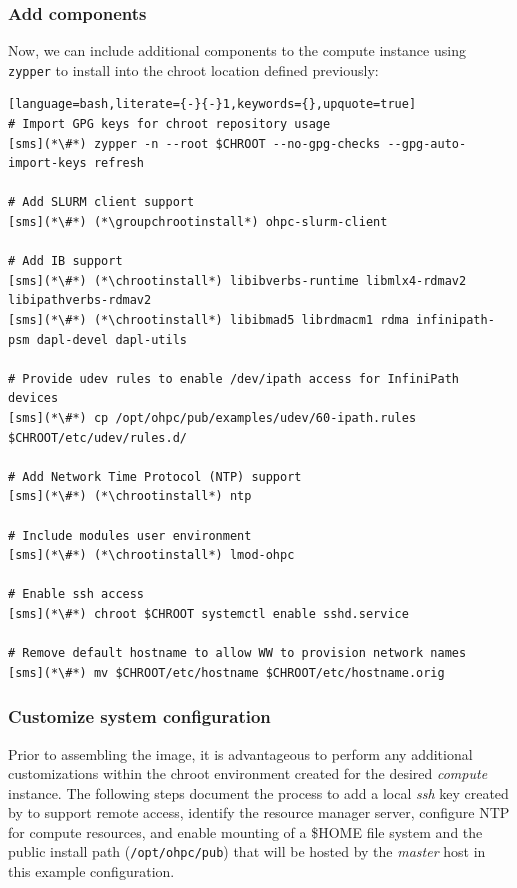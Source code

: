 \documentclass[letterpaper]{article}
\newcommand{\chrootinstall}{zypper -n --root \$CHROOT install}
\newcommand{\groupchrootinstall}{zypper -n --root \$CHROOT install -t pattern}
\begin{document}
\subsubsection{Add \OHPC{} components} \label{sec:add_components}



\noindent Now, we can include additional components to the compute instance using
\texttt{zypper} to install into the chroot location defined previously:

\begin{lstlisting}[language=bash,literate={-}{-}1,keywords={},upquote=true]
# Import GPG keys for chroot repository usage
[sms](*\#*) zypper -n --root $CHROOT --no-gpg-checks --gpg-auto-import-keys refresh

# Add SLURM client support
[sms](*\#*) (*\groupchrootinstall*) ohpc-slurm-client

# Add IB support
[sms](*\#*) (*\chrootinstall*) libibverbs-runtime libmlx4-rdmav2 libipathverbs-rdmav2
[sms](*\#*) (*\chrootinstall*) libibmad5 librdmacm1 rdma infinipath-psm dapl-devel dapl-utils

# Provide udev rules to enable /dev/ipath access for InfiniPath devices
[sms](*\#*) cp /opt/ohpc/pub/examples/udev/60-ipath.rules $CHROOT/etc/udev/rules.d/

# Add Network Time Protocol (NTP) support
[sms](*\#*) (*\chrootinstall*) ntp

# Include modules user environment
[sms](*\#*) (*\chrootinstall*) lmod-ohpc

# Enable ssh access 
[sms](*\#*) chroot $CHROOT systemctl enable sshd.service

# Remove default hostname to allow WW to provision network names
[sms](*\#*) mv $CHROOT/etc/hostname $CHROOT/etc/hostname.orig
\end{lstlisting}

\subsubsection{Customize system configuration} \label{sec:master_customization}

Prior to assembling the image, it is advantageous to perform any additional
customizations within the chroot environment created for the desired {\em
 compute} instance. The following steps document the process to add a local
{\em ssh} key created by \Warewulf{} to support remote access, identify the
resource manager server, configure NTP for compute resources, and enable \NFS{}
mounting of a \$HOME file system and the public \OHPC{} install path
(\texttt{/opt/ohpc/pub}) that will be hosted by the {\em master} host in this
example configuration.
\end{document}
